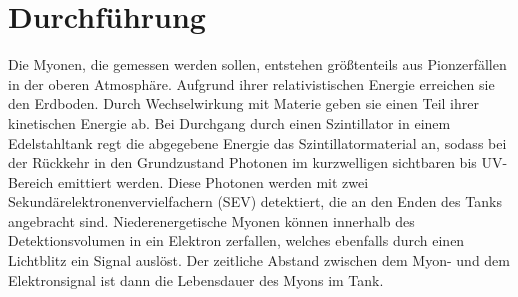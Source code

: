 \section{Durchf\"{u}hrung}

Die Myonen, die gemessen werden sollen, entstehen größtenteils aus Pionzerfällen in der oberen Atmosphäre. Aufgrund ihrer relativistischen Energie erreichen sie den Erdboden. Durch Wechselwirkung mit Materie geben sie einen Teil ihrer kinetischen Energie ab. Bei Durchgang durch einen Szintillator in einem Edelstahltank regt die abgegebene Energie das Szintillatormaterial an, sodass bei der Rückkehr in den Grundzustand Photonen im kurzwelligen sichtbaren bis UV-Bereich emittiert werden. Diese Photonen werden mit zwei Sekundärelektronenvervielfachern (SEV) detektiert, die an den Enden des Tanks angebracht sind. Niederenergetische Myonen können innerhalb des Detektionsvolumen in ein Elektron zerfallen, welches ebenfalls durch einen Lichtblitz ein Signal auslöst. Der zeitliche Abstand zwischen dem Myon- und dem Elektronsignal ist dann die Lebensdauer des Myons im Tank.

